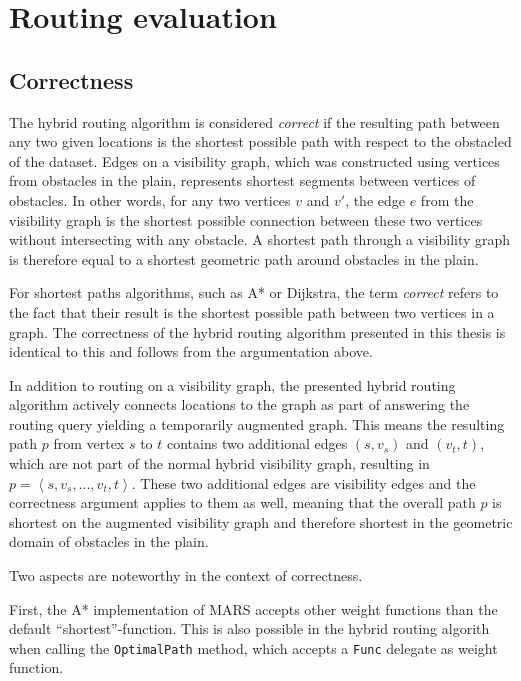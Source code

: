 	
\section{Routing evaluation}

	\subsection{Correctness}
	
		The hybrid routing algorithm is considered \emph{correct} if the resulting path between any two given locations is the shortest possible path with respect to the obstacled of the dataset.
		Edges on a visibility graph, which was constructed using vertices from obstacles in the plain, represents shortest segments between vertices of obstacles.
		In other words, for any two vertices $v$ and $v'$, the edge $e$ from the visibility graph is the shortest possible connection between these two vertices without intersecting with any obstacle.
		A shortest path through a visibility graph is therefore equal to a shortest geometric path around obstacles in the plain.
		
		For shortest paths algorithms, such as A* or Dijkstra, the term \emph{correct} refers to the fact that their result is the shortest possible path between two vertices in a graph.
		The correctness of the hybrid routing algorithm presented in this thesis is identical to this and follows from the argumentation above.
		
		In addition to routing on a visibility graph, the presented hybrid routing algorithm actively connects locations to the graph as part of answering the routing query yielding a temporarily augmented graph.
		This means the resulting path $p$ from vertex $s$ to $t$ contains two additional edges $(s, v_s)$ and $(v_t, t)$, which are not part of the normal hybrid visibility graph, resulting in $p=\left\langle s, v_s, ..., v_t, t \right\rangle$.
		These two additional edges are visibility edges and the correctness argument applies to them as well, meaning that the overall path $p$ is shortest on the augmented visibility graph and therefore shortest in the geometric domain of obstacles in the plain.
		
		Two aspects are noteworthy in the context of correctness.
		
		First, the A* implementation of MARS accepts other weight functions than the default \enquote{shortest}-function.
		This is also possible in the hybrid routing algorith when calling the \texttt{OptimalPath} method, which accepts a \texttt{Func} delegate as weight function.
		
